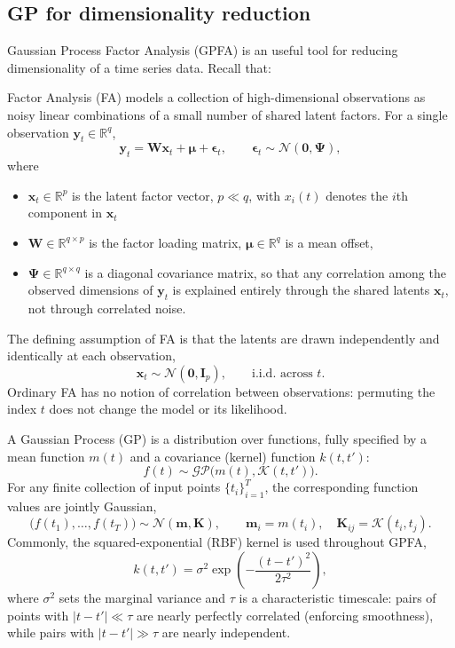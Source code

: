 \documentclass[11pt]{article}
\begin{document}
\subsection{GP for dimensionality reduction}
Gaussian Process Factor Analysis (GPFA) is an useful tool for reducing dimensionality of a time series data.
Recall that:

Factor Analysis (FA) models a collection of high-dimensional observations as noisy linear combinations of a small number of shared latent factors. For a single observation $\mathbf{y}_t \in \mathbb{R}^q$,
\[
    \mathbf{y}_t = \mathbf{W} \mathbf{x}_t + \boldsymbol{\mu} + \boldsymbol{\epsilon}_t, \qquad \boldsymbol{\epsilon}_t \sim \mathcal{N}(\mathbf{0}, \boldsymbol{\Psi}),
\]
where
\begin{itemize}
    \item $\mathbf{x}_t \in \mathbb{R}^p$ is the latent factor vector, $p \ll q$, with $x_i(t)$ denotes the $i$th component in $\mathbf{x}_t$
    \item $\mathbf{W} \in \mathbb{R}^{q \times p}$ is the factor loading matrix, $\boldsymbol{\mu} \in \mathbb{R}^q$ is a mean offset,
    \item $\boldsymbol{\Psi} \in \mathbb{R}^{q \times q}$ is a diagonal covariance matrix, so that any correlation among the observed dimensions of $\mathbf{y}_t$ is explained entirely through the shared latents $\mathbf{x}_t$, not through correlated noise.
\end{itemize}
The defining assumption of FA is that the latents are drawn independently and identically at each observation,
\[
    \mathbf{x}_t \sim \mathcal{N}(\mathbf{0}, \mathbf{I}_p), \qquad \text{i.i.d. across } t.
\]
Ordinary FA has no notion of correlation between observations: permuting the index $t$ does not change the model or its likelihood.

A Gaussian Process (GP) is a distribution over functions, fully specified by a mean function $m(t)$ and a covariance (kernel) function $k(t,t')$:
\[
    f(t) \sim \mathcal{GP}\big(m(t), \mathcal{K}(t,t')\big).
\]
For any finite collection of input points $\{ t_i \}_{i=1}^T$, the corresponding function values are jointly Gaussian,
\[
    \big(f(t_1), \dots, f(t_T)\big) \sim \mathcal{N}(\mathbf{m}, \mathbf{K}), \qquad
    \mathbf{m}_i = m(t_i), \quad \mathbf{K}_{ij} = \mathcal{K}(t_i, t_j).
\]
Commonly, the squared-exponential (RBF) kernel is used throughout GPFA,
\[
    k(t,t') = \sigma^2 \exp\!\left(-\frac{(t-t')^2}{2\tau^2}\right),
\]
where $\sigma^2$ sets the marginal variance and $\tau$ is a characteristic timescale: pairs of points with $|t - t'| \ll \tau$ are nearly perfectly correlated (enforcing smoothness), while pairs with $|t-t'| \gg \tau$ are nearly independent.
\end{document}
